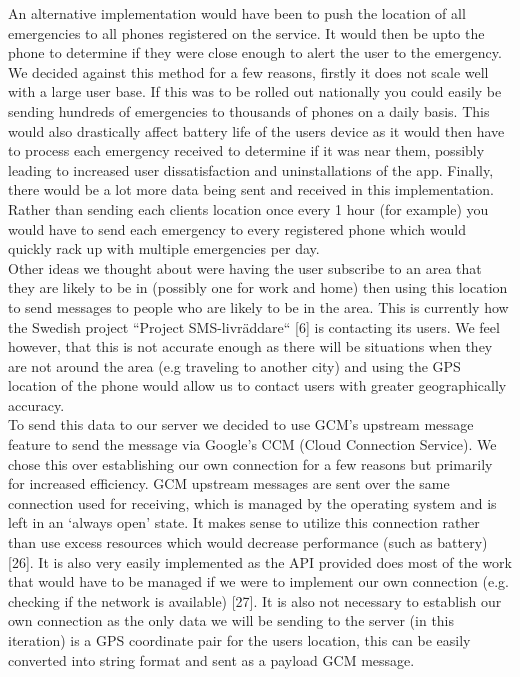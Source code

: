 \documentclass{article}
\begin{document}
An alternative implementation would have been to push the location of all emergencies to all phones registered on the service. It would then be upto the phone to determine if they were close enough to alert the user to the emergency. We decided against this method for a few reasons, firstly it does not scale well with a large user base. If this was to be rolled out nationally you could easily be sending hundreds of emergencies to thousands of phones on a daily basis. This would also drastically affect battery life of the users device as it would then have to process each emergency received to determine if it was near them, possibly leading to increased user dissatisfaction and uninstallations of the app. Finally, there would be a lot more data being sent and received in this implementation. Rather than sending each clients location once every 1 hour (for example) you would have to send each emergency to every registered phone which would quickly rack up with multiple emergencies per day.\\

Other ideas we thought about were having the user subscribe to an area that they are likely to be in (possibly one for work and home) then using this location to send messages to people who are likely to be in the area. This is currently how the Swedish project “Project SMS-livräddare“ [6] is contacting its users. We feel however, that this is not accurate enough as there will be situations when they are not around the area (e.g traveling to another city) and using the GPS location of the phone would allow us to contact users with greater geographically accuracy. \\

To send this data to our server we decided to use GCM’s upstream message feature to send the message via Google’s CCM (Cloud Connection Service). We chose this over establishing our own connection for a few reasons but primarily for increased efficiency. GCM upstream messages are sent over the same connection used for receiving, which is managed by the operating system and is left in an ‘always open’ state. It makes sense to utilize this connection rather than use excess resources which would decrease performance (such as battery) [26]. It is also very easily implemented as the API provided does most of the work that would have to be managed if we were to implement our own connection (e.g. checking if the network is available) [27]. It is also not necessary to establish our own connection as the only data we will be sending to the server (in this iteration) is a GPS coordinate pair for the users location, this can be easily converted into string format and sent as a payload GCM message.\\
\end{document}
